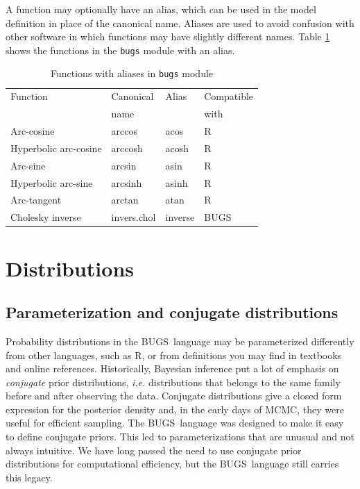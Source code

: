 \documentclass[11pt, a4paper, titlepage]{report}
\newcommand{\BUGS}{\textsf{BUGS}}
\begin{document}
A function may optionally have an alias, which can be used in the
model definition in place of the canonical name. Aliases are used to
avoid confusion with other software in which functions may have
slightly different names. Table \ref{table:bugs:functions:alias} shows
the functions in the \texttt{bugs} module with an alias.

\begin{table}
\begin{center}
\begin{tabular}{llll}
\hline
Function               & Canonical & Alias & Compatible  \\
                       & name      &       & with         \\
\hline
Arc-cosine             & arccos    & acos  & R \\
Hyperbolic arc-cosine  & arccosh   & acosh & R \\
Arc-sine               & arcsin    & asin  & R \\
Hyperbolic arc-sine    & arcsinh   & asinh & R \\
Arc-tangent            & arctan    & atan  & R \\
Cholesky inverse       & invers.chol & inverse & BUGS \\
\hline
\end{tabular}
\caption{Functions with aliases in \texttt{bugs} module
  \label{table:bugs:functions:alias}}
\end{center}
\end{table}

\chapter{Distributions}
\label{chapter:distributions}

\section{Parameterization and conjugate distributions}
\label{section:conjugate}

Probability distributions in the \BUGS\ language may be parameterized
differently from other languages, such as R, or from definitions you
may find in textbooks and online references. Historically, Bayesian
inference put a lot of emphasis on {\em conjugate} prior
distributions, {\em i.e.} distributions that belongs to the same
family before and after observing the data. Conjugate distributions
give a closed form expression for the posterior density and, in the
early days of MCMC, they were useful for efficient sampling. The
\BUGS\ language was designed to make it easy to define conjugate
priors.  This led to parameterizations that are unusual and not always
intuitive. We have long passed the need to use conjugate prior
distributions for computational efficiency, but the \BUGS\ language
still carries this legacy.
\end{document}
